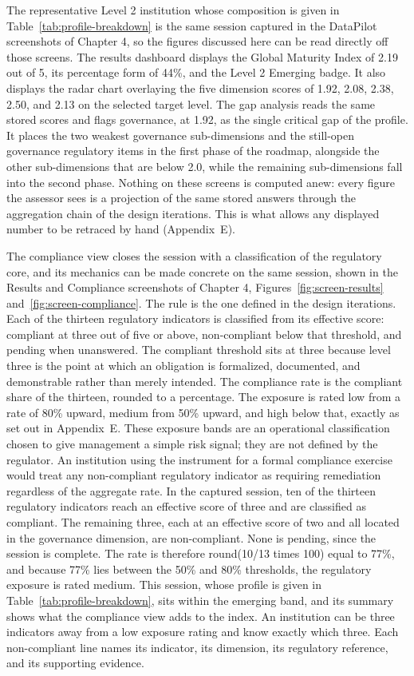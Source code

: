 The representative Level 2 institution whose composition is given in Table~\ref{tab:profile-breakdown} is the same session captured in the DataPilot screenshots of Chapter 4, so the figures discussed here can be read directly off those screens. The results dashboard displays the Global Maturity Index of 2.19 out of 5, its percentage form of 44\%, and the Level 2 Emerging badge. It also displays the radar chart overlaying the five dimension scores of 1.92, 2.08, 2.38, 2.50, and 2.13 on the selected target level. The gap analysis reads the same stored scores and flags governance, at 1.92, as the single critical gap of the profile. It places the two weakest governance sub-dimensions and the still-open governance regulatory items in the first phase of the roadmap, alongside the other sub-dimensions that are below 2.0, while the remaining sub-dimensions fall into the second phase. Nothing on these screens is computed anew: every figure the assessor sees is a projection of the same stored answers through the aggregation chain of the design iterations. This is what allows any displayed number to be retraced by hand (Appendix~E).

The compliance view closes the session with a classification of the regulatory core, and its mechanics can be made concrete on the same session, shown in the Results and Compliance screenshots of Chapter 4, Figures~\ref{fig:screen-results} and~\ref{fig:screen-compliance}. The rule is the one defined in the design iterations. Each of the thirteen regulatory indicators is classified from its effective score: compliant at three out of five or above, non-compliant below that threshold, and pending when unanswered. The compliant threshold sits at three because level three is the point at which an obligation is formalized, documented, and demonstrable rather than merely intended. The compliance rate is the compliant share of the thirteen, rounded to a percentage. The exposure is rated low from a rate of 80\% upward, medium from 50\% upward, and high below that, exactly as set out in Appendix~E. These exposure bands are an operational classification chosen to give management a simple risk signal; they are not defined by the regulator. An institution using the instrument for a formal compliance exercise would treat any non-compliant regulatory indicator as requiring remediation regardless of the aggregate rate. In the captured session, ten of the thirteen regulatory indicators reach an effective score of three and are classified as compliant. The remaining three, each at an effective score of two and all located in the governance dimension, are non-compliant. None is pending, since the session is complete. The rate is therefore round(10/13 times 100) equal to 77\%, and because 77\% lies between the 50\% and 80\% thresholds, the regulatory exposure is rated medium. This session, whose profile is given in Table~\ref{tab:profile-breakdown}, sits within the emerging band, and its summary shows what the compliance view adds to the index. An institution can be three indicators away from a low exposure rating and know exactly which three. Each non-compliant line names its indicator, its dimension, its regulatory reference, and its supporting evidence.

